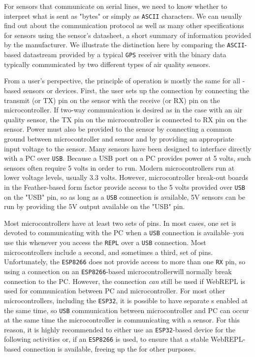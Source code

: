 For sensors that communicate on serial lines, we need to know whether to interpret what is sent as "bytes" or simply as \texttt{ASCII} characters.
We can usually find out about the communication protocol as well as many other specifications for sensors using the sensor's datasheet, a short summary of information provided by the manufacturer.
We illustrate the distinction here by comparing the \texttt{ASCII}-based datastream provided by a typical \texttt{GPS} receiver with the binary data typically communicated by two different types of air quality sensors.  

From a user's perspective, the principle of operation is mostly the same for all \uart -based sensors or devices.
First, the user sets up the \uart connection by connecting the transmit (or TX) pin on the sensor with the receive (or RX) pin on the microcontroller.
If two-way communication is desired as in the case with an air quality sensor, the TX pin on the microcontroller is connected to RX pin on the sensor.
Power must also be provided to the sensor by connecting a common ground between microcontroller and sensor and by providing an appropriate input voltage to the sensor.
Many sensors have been designed to interface directly with a PC over \texttt{USB}.
Because a USB port on a PC provides power at 5 volts, such sensors often require 5 volts in order to run.
Modern microcontrollers run at lower voltage levels, usually 3.3 volts.
However, microcontroller break-out boards in the Feather-based form factor provide access to the 5 volts provided over \texttt{USB} on the "USB" pin, so as long as a \texttt{USB} connection is available, 5V sensors can be run by providing the 5V output available on the "USB" pin.

\begin{kaobox}[frametitle=The \texttt{ESP8266} \uart Gotcha!]
Most microcontrollers have at least two sets of \uart pins.
In most cases, one set is devoted to communicating with the PC when a \texttt{USB} connection is available--you use this whenever you access the \Micropython \texttt{REPL} over a \texttt{USB} connection.
Most microcontrollers include a second, and sometimes a third, set of \uart pins.
Unfortunately, the \texttt{ESP8266} does not provide access to more than one \texttt{RX} pin, so using a \uart connection on an \texttt{ESP8266}-based microcontrollerwill normally break connection to the PC.
However, the \uart connection \emph{can} still be used if WebREPL is used for communication between PC and microcontroller.
For most other microcontrollers, including the \texttt{ESP32}, it is possible to have separate \uart s enabled at the same time, so \texttt{USB} communication between microcontroller and PC can occur at the same time the microcontroller is communicating with a sensor.
For this reason, it is highly recommended to either use an \texttt{ESP32}-based device for the following activities or, if an \texttt{ESP8266} is used, to ensure that a stable WebREPL-based connection is available, freeing up the \uart for other purposes.
\end{kaobox}

